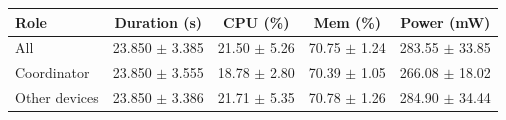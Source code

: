 \begin{tabular}{lcccc}
\hline
\textbf{Role} & \textbf{Duration (s)} & \textbf{CPU (\%)} & \textbf{Mem (\%)} & \textbf{Power (mW)} \\
\hline
All & 23.850 $\pm$ 3.385 & 21.50 $\pm$ 5.26 & 70.75 $\pm$ 1.24 & 283.55 $\pm$ 33.85 \\
Coordinator & 23.850 $\pm$ 3.555 & 18.78 $\pm$ 2.80 & 70.39 $\pm$ 1.05 & 266.08 $\pm$ 18.02 \\
Other devices & 23.850 $\pm$ 3.386 & 21.71 $\pm$ 5.35 & 70.78 $\pm$ 1.26 & 284.90 $\pm$ 34.44 \\
\hline
\end{tabular}
